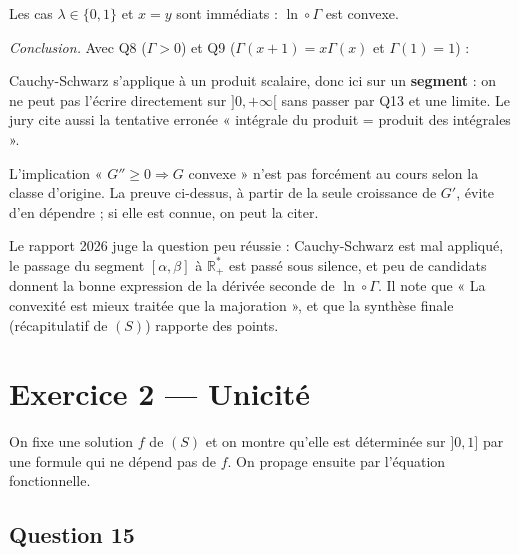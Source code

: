 \documentclass[11pt,a4paper]{article}
\newcommand{\equationajustee}[1]{%
  \sbox{\boiteequation}{$\displaystyle #1$}%
  \ifdim\wd\boiteequation>\linewidth
    \[\resizebox{\linewidth}{!}{\usebox{\boiteequation}}\]%
  \else
    \[#1\]%
  \fi}
\begin{document}
Les cas \(\lambda\in\{0,1\}\) et \(x=y\) sont immédiats : \(\ln\circ\Gamma\) est convexe.

\emph{Conclusion.} Avec Q8 (\(\Gamma>0\)) et Q9 (\(\Gamma(x+1)=x\Gamma(x)\) et \(\Gamma(1)=1\)) :

\equationajustee{\boxed{\Gamma\text{ \text{vérifie} }(S).}}

\begin{piege}

Cauchy-Schwarz s'applique à un produit scalaire, donc ici sur un \textbf{segment} : on ne peut pas l'écrire directement sur \(]0,+\infty[\) sans passer par Q13 et une limite. Le jury cite aussi la tentative erronée « intégrale du produit = produit des intégrales ».

\end{piege}

\begin{methode}

L'implication « \(G''\ge0\Rightarrow G\) convexe » n'est pas forcément au cours selon la classe d'origine. La preuve ci-dessus, à partir de la seule croissance de \(G'\), évite d'en dépendre ; si elle est connue, on peut la citer.

\end{methode}

\begin{jury}

Le rapport 2026 juge la question peu réussie : Cauchy-Schwarz est mal appliqué, le passage du segment \([\alpha,\beta]\) à \(\mathbb R_+^*\) est passé sous silence, et peu de candidats donnent la bonne expression de la dérivée seconde de \(\ln\circ\Gamma\). Il note que « La convexité est mieux traitée que la majoration », et que la synthèse finale (récapitulatif de \((S)\)) rapporte des points.

\end{jury}

\hypertarget{exercice-2-unicituxe9}{%
\section{Exercice 2 --- Unicité}\label{exercice-2-unicituxe9}}

On fixe une solution \(f\) de \((S)\) et on montre qu'elle est déterminée sur \(]0,1]\) par une formule qui ne dépend pas de \(f\). On propage ensuite par l'équation fonctionnelle.

\hypertarget{question-15}{%
\subsection{Question 15}\label{question-15}}
\end{document}

